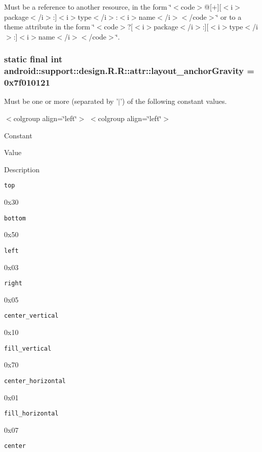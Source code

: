 Must be a reference to another resource, in the form \char`\"{}$<$code$>$@\mbox{[}+\mbox{]}\mbox{[}$<$i$>$package$<$/i$>$:\mbox{]}$<$i$>$type$<$/i$>$:$<$i$>$name$<$/i$>$$<$/code$>$\char`\"{} or to a theme attribute in the form \char`\"{}$<$code$>$?\mbox{[}$<$i$>$package$<$/i$>$:\mbox{]}\mbox{[}$<$i$>$type$<$/i$>$:\mbox{]}$<$i$>$name$<$/i$>$$<$/code$>$\char`\"{}. \hypertarget{classandroid_1_1support_1_1design_1_1_r_1_1attr_c1c3dad08591f9b116e426f24a075959}{
\subsubsection[{layout\_\-anchorGravity}]{\setlength{\rightskip}{0pt plus 5cm}static final int android::support::design.R.R::attr::layout\_\-anchorGravity = 0x7f010121}}
\label{classandroid_1_1support_1_1design_1_1_r_1_1attr_c1c3dad08591f9b116e426f24a075959}


Must be one or more (separated by '$|$') of the following constant values. \begin{TabularC}{0}
\hline
\end{TabularC}
$<$colgroup align=\char`\"{}left\char`\"{}$>$ $<$colgroup align=\char`\"{}left\char`\"{}$>$ 

Constant

Value

Description 

{\tt top}

0x30

{\tt bottom}

0x50

{\tt left}

0x03

{\tt right}

0x05

{\tt center\_\-vertical}

0x10

{\tt fill\_\-vertical}

0x70

{\tt center\_\-horizontal}

0x01

{\tt fill\_\-horizontal}

0x07

{\tt center}

